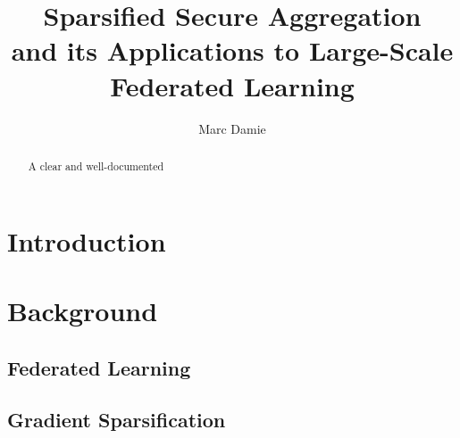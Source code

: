 \documentclass[sigconf,balance=false]{acmart}
\begin{document}
\title[Sparsified Secure Aggregation]{Sparsified Secure Aggregation\\ and its Applications to Large-Scale Federated Learning}


\author{Marc Damie}



\renewcommand{\shortauthors}{Damie}

\begin{abstract}
	A clear and well-documented
\end{abstract}




\maketitle

\section{Introduction}

\section{Background}
\subsection{Federated Learning}

\subsection{Gradient Sparsification}
\end{document}

